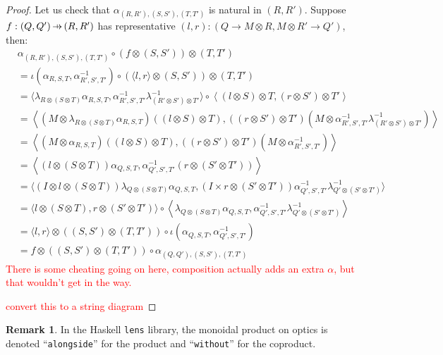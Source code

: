 \documentclass[11pt,a4paper]{article}
\theoremstyle{plain}
\theoremstyle{definition}
\newtheorem{remark}[theorem]{Remark}
\newcommand{\hto}{\ensuremath{\,\mathaccent\shortmid\rightarrow\,}}
\newcommand{\todo}[1]{\textcolor{red}{\small #1}}
\begin{document}
\begin{proof}
Let us check that $\alpha_{(R, R'), (S, S'), (T, T')}$ is natural in $(R, R')$. Suppose $f : (Q, Q') \hto (R, R')$ has representative $(l, r) : (Q \to M \otimes R, M \otimes R' \to Q')$, then:
\begin{align*}
&\alpha_{(R, R'), (S, S'), (T, T')} \circ (f \otimes (S, S')) \otimes (T, T') \\
&= \iota(\alpha_{R,S,T}, \alpha_{R',S',T'}^{-1})  \circ (\langle l, r \rangle \otimes (S, S')) \otimes (T, T') \\
&= \langle\lambda_{R \otimes (S \otimes T)}\alpha_{R,S,T}, \alpha_{R',S',T'}^{-1} \lambda^{-1}_{(R' \otimes S') \otimes T'} \rangle  \circ \left\langle (l \otimes S) \otimes T, (r \otimes S') \otimes T' \right\rangle \\
&=\left\langle (M \otimes \lambda_{R \otimes (S \otimes T)}\alpha_{R,S,T})((l \otimes S) \otimes T), ((r \otimes S') \otimes T') (M \otimes \alpha_{R',S',T'}^{-1} \lambda^{-1}_{(R' \otimes S') \otimes T'} ) \right\rangle \\
&=\left\langle (M \otimes \alpha_{R,S,T})((l \otimes S) \otimes T), ((r \otimes S') \otimes T') (M \otimes \alpha_{R',S',T'}^{-1} )\right\rangle \\
&=\left\langle (l \otimes (S \otimes T))\alpha_{Q,S,T}, \alpha_{Q',S',T'}^{-1}(r \otimes (S' \otimes T')) \right\rangle \\
&= \langle (I \otimes l \otimes (S \otimes T)) \lambda_{Q \otimes (S \otimes T)}\alpha_{Q,S,T}, (I \times r \otimes (S' \otimes T')) \alpha_{Q',S',T'}^{-1} \lambda^{-1}_{Q' \otimes (S' \otimes T')}\rangle \\
&= \langle l \otimes (S \otimes T), r \otimes (S' \otimes T')\rangle \circ \left\langle \lambda_{Q \otimes (S \otimes T)}\alpha_{Q,S,T}, \alpha_{Q',S',T'}^{-1} \lambda^{-1}_{Q' \otimes (S' \otimes T')} \right\rangle \\
&= \langle l, r \rangle \otimes ((S, S') \otimes (T, T')) \circ \iota(\alpha_{Q,S,T}, \alpha_{Q',S',T'}^{-1}) \\
&= f \otimes ((S, S') \otimes (T, T')) \circ \alpha_{(Q, Q'), (S, S'), (T, T')} 
\end{align*}
\todo{There is some cheating going on here, composition actually adds an extra $\alpha$, but that wouldn't get in the way.}

\todo{convert this to a string diagram}
\end{proof}

\begin{remark}
In the Haskell \texttt{lens} library, the monoidal product on optics is denoted ``\texttt{alongside}'' for the product and ``\texttt{without}'' for the coproduct.
\end{remark}
\end{document}
